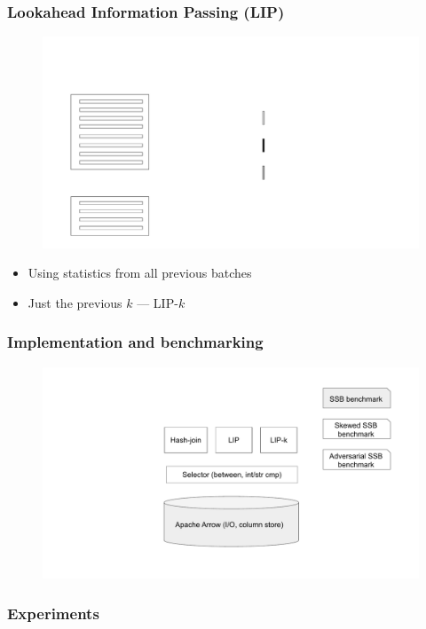 \documentclass{beamer}
\begin{document}
\begin{frame}[noframenumbering]
  \frametitle{Lookahead Information Passing (LIP)}
  \begin{figure}
    \centering
    \includegraphics[page={26},height=0.7\textheight,keepaspectratio]{lip-animation}
  \end{figure}
  \pause
  \begin{itemize}
    \item Using statistics from all previous batches
    \item Just the previous $k$ \pause --- LIP-$k$
  \end{itemize}
\end{frame}

\begin{frame}
  \frametitle{Implementation and benchmarking}
  \begin{figure}
    \centering
    \includegraphics[height=0.7\textheight,keepaspectratio]{implementation}
  \end{figure}
\end{frame}


\begin{frame}
  \frametitle{Experiments}
  \begin{figure}
    \centering
  \end{figure}
\end{frame}
\end{document}
